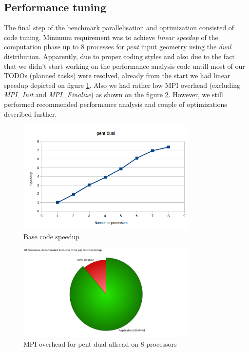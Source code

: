 \documentclass{article}
\begin{document}
\subsection{Performance tuning}
The final step of the benchmark parallelisation and optimization consisted of code tuning. Minimum requirement was to achieve \textit{linear speedup} of the computation phase up to 8 processes for \textit{pent} input geometry using the \textit{dual} distribution. Apparently, due to proper coding styles and also due to the fact that we didn't start working on the performance analysis code untill most of our TODOs (planned tasks) were resolved, already from the start we had linear speedup depicted on figure \ref{fig:11}. Also we had rather low MPI overhead (excluding \textit{MPI\_Init} and \textit{MPI\_Finalize}) as shown on the figure \ref{fig:12}. However, we still performed recommended performance analysis and couple of optimizations described further.
\begin{figure}[h!]
	\begin{center}
		\includegraphics[width=0.8\textwidth]{pent_computation_speedup_1-8proc.png}
		\caption{Base code speedup}
		\label{fig:11}
	\end{center}
\end{figure}
\begin{figure}[h!]
	\begin{center}
		\includegraphics[width=0.8\textwidth]{no_mpi_init_finalize-pent-dual-allread-8-Function_Summary_traces.png}
		\caption{MPI overhead for pent dual allread on 8 processors}
		\label{fig:12}
	\end{center}
\end{figure}
\end{document}
